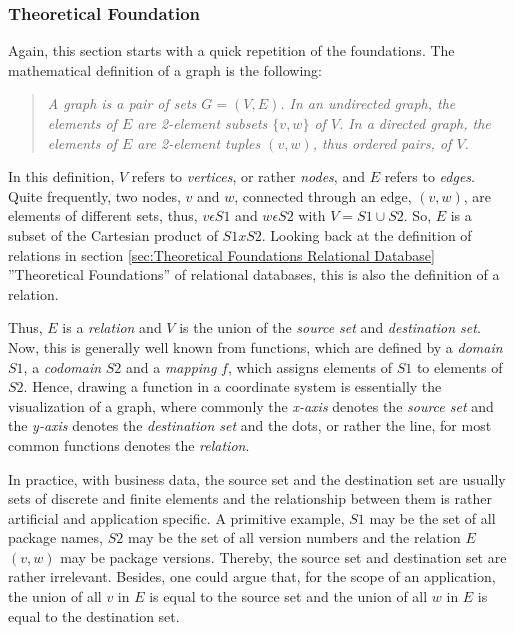 \subsubsection{Theoretical Foundation} \label{sec:GraphDB Theoretical Foundation}
Again, this section starts with a quick repetition of the foundations. The mathematical definition of a graph is the following: 
\begin{quote}
	\textit{A graph is a pair of sets $G = (V,E)$. In an undirected graph, the elements of $E$ are 2-element subsets $\{v,w\}$ of $V$. In a directed graph, the elements of $E$ are 2-element tuples $(v,w)$, thus ordered pairs, of $V$.}
	\cite{IntroductionToAlgorithms}
\end{quote}
In this definition, $V$ refers to \emph{vertices}, or rather \emph{nodes}, and $E$ refers to \emph{edges}. Quite frequently, two nodes, $v$ and $w$, connected through an edge, $(v,w)$, are elements of different sets, thus, $v \epsilon S1$ and $w \epsilon S2$ with $V = S1 \cup S2$. So, $E$ is a subset of the Cartesian product of $S1 x S2$. Looking back at the definition of relations in section \ref{sec:Theoretical Foundations Relational Database} ''Theoretical Foundations'' of relational databases, this is also the definition of a relation.\par
Thus, $E$ is a \emph{relation} and $V$ is the union of the \emph{source set} and \emph{destination set}. Now, this is generally well known from functions, which are defined by a \emph{domain} $S1$, a \emph{codomain} $S2$ and a \emph{mapping} $f$, which assigns elements of $S1$ to elements of $S2$. Hence, drawing a function in a coordinate system is essentially the visualization of a graph, where commonly the \emph{x-axis} denotes the \emph{source set} and the \emph{y-axis} denotes the \emph{destination set} and the dots, or rather the line, for most common functions denotes the \emph{relation}.\par
In practice, with business data, the source set and the destination set are usually sets of discrete and finite elements and the relationship between them is rather artificial and application specific. A primitive example, $S1$ may be the set of all package names, $S2$ may be the set of all version numbers and the relation $E$ $(v, w)$ may be package versions. Thereby, the source set and destination set are rather irrelevant. Besides, one could argue that, for the scope of an application, the union of all $v$ in $E$ is equal to the source set and the union of all $w$ in $E$ is equal to the destination set.

